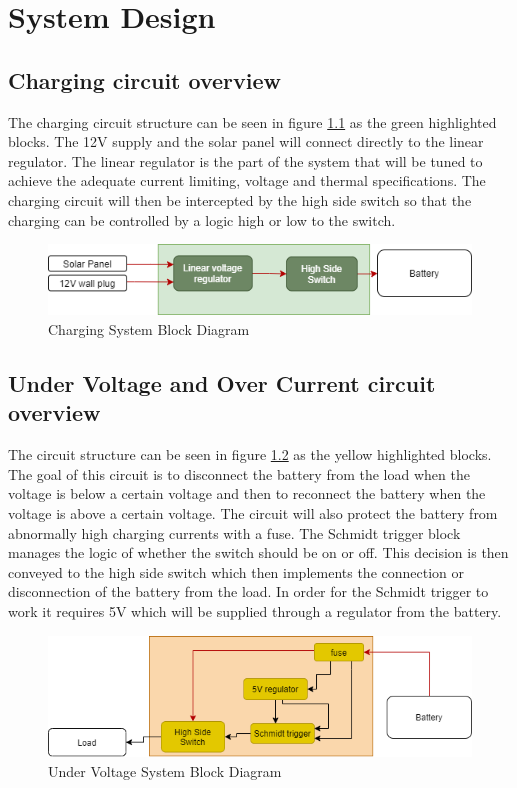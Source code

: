 \chapter{System Design}\label{Lit:sysDesign}
\section{Charging circuit overview}
The charging circuit structure can be seen in figure \ref{fig:A2block} as the green highlighted blocks. The 12V supply and the solar panel will connect directly to the linear regulator. The linear regulator is the part of the system that will be tuned to achieve the adequate current limiting, voltage and thermal specifications. The charging circuit will then be intercepted by the high side switch so that the charging can be controlled by a logic high or low to the switch. 

\begin{figure}[!htb]
\centering
\includegraphics[scale=0.5]{./Figures/A2}
\caption{Charging System Block Diagram}
\label{fig:A2block}
\end{figure}

\section{Under Voltage and Over Current circuit overview}
The circuit structure can be seen in figure \ref{fig:A3block} as the yellow highlighted blocks. The goal of this circuit is to disconnect the battery from the load when the voltage is below a certain voltage and then to reconnect the battery when the voltage is above a certain voltage. The circuit will also protect the battery from abnormally high charging currents with a fuse. The Schmidt trigger block manages the logic of whether the switch should be on or off. This decision is then conveyed to the high side switch which then implements the connection or disconnection of the battery from the load. In order for the Schmidt trigger to work it requires 5V which will be supplied through a regulator from the battery.

\begin{figure}[!htb]
\centering
\includegraphics[scale=0.5]{./Figures/A3}
\caption{Under Voltage System Block Diagram}
\label{fig:A3block}
\end{figure}

